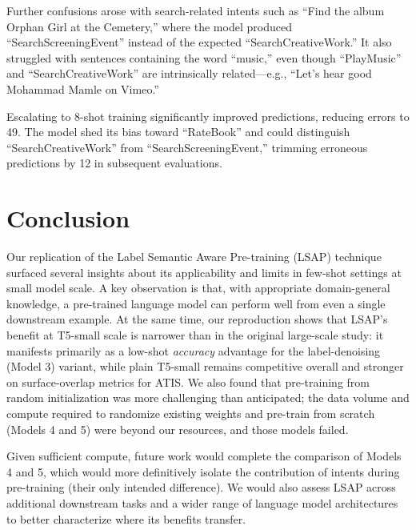 \documentclass[11pt]{article}
\begin{document}
Further confusions arose with search-related intents such as ``Find the
album Orphan Girl at the Cemetery,'' where the model produced
``SearchScreeningEvent'' instead of the expected ``SearchCreativeWork.'' It
also struggled with sentences containing the word ``music,'' even though
``PlayMusic'' and ``SearchCreativeWork'' are intrinsically related---e.g.,
``Let's hear good Mohammad Mamle on Vimeo.''

Escalating to 8-shot training significantly improved predictions, reducing
errors to 49. The model shed its bias toward ``RateBook'' and could
distinguish ``SearchCreativeWork'' from ``SearchScreeningEvent,'' trimming
erroneous predictions by 12 in subsequent evaluations.

\section{Conclusion}

Our replication of the Label Semantic Aware Pre-training (LSAP) technique
surfaced several insights about its applicability and limits in few-shot
settings at small model scale. A key observation is that, with appropriate
domain-general knowledge, a pre-trained language model can perform well from
even a single downstream example. At the same time, our reproduction shows
that LSAP's benefit at T5-small scale is narrower than in the original
large-scale study: it manifests primarily as a low-shot \emph{accuracy}
advantage for the label-denoising (Model 3) variant, while plain T5-small
remains competitive overall and stronger on surface-overlap metrics for
ATIS. We also found that pre-training from random initialization was more
challenging than anticipated; the data volume and compute required to
randomize existing weights and pre-train from scratch (Models 4 and 5) were
beyond our resources, and those models failed.

Given sufficient compute, future work would complete the comparison of
Models 4 and 5, which would more definitively isolate the contribution of
intents during pre-training (their only intended difference). We would also
assess LSAP across additional downstream tasks and a wider range of language
model architectures to better characterize where its benefits transfer.
\end{document}
